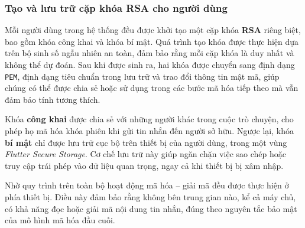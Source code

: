 \subsubsection{Tạo và lưu trữ cặp khóa RSA cho người dùng}
\indent Mỗi người dùng trong hệ thống đều được khởi tạo một cặp khóa \textbf{RSA} riêng biệt, bao gồm khóa công khai và khóa bí mật.  
Quá trình tạo khóa được thực hiện dựa trên bộ sinh số ngẫu nhiên an toàn, đảm bảo rằng mỗi cặp khóa là duy nhất và không thể dự đoán.  
Sau khi được sinh ra, hai khóa được chuyển sang định dạng \texttt{PEM}, định dạng tiêu chuẩn trong lưu trữ và trao đổi thông tin mật mã, giúp chúng có thể được chia sẻ hoặc sử dụng trong các bước mã hóa tiếp theo mà vẫn đảm bảo tính tương thích.

\indent Khóa \textbf{công khai} được chia sẻ với những người khác trong cuộc trò chuyện, cho phép họ mã hóa khóa phiên khi gửi tin nhắn đến người sở hữu.  
Ngược lại, khóa \textbf{bí mật} chỉ được lưu trữ cục bộ trên thiết bị của người dùng, trong một vùng \textit{Flutter Secure Storage}.  
Cơ chế lưu trữ này giúp ngăn chặn việc sao chép hoặc truy cập trái phép vào dữ liệu quan trọng, ngay cả khi thiết bị bị xâm nhập.

\indent Nhờ quy trình trên toàn bộ hoạt động mã hóa – giải mã đều được thực hiện ở phía thiết bị.  
Điều này đảm bảo rằng không bên trung gian nào, kể cả máy chủ, có khả năng đọc hoặc giải mã nội dung tin nhắn, đúng theo nguyên tắc bảo mật của mô hình mã hóa đầu cuối.
